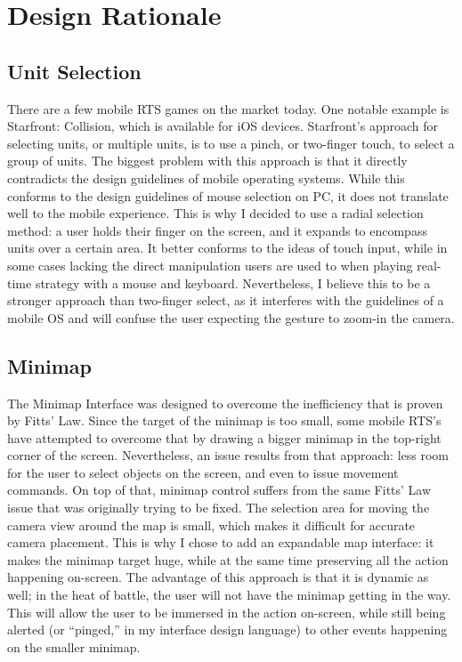 \documentclass[11pt]{article}
\begin{document}
\section{Design Rationale}
	\subsection{Unit Selection}
	There are a few mobile RTS games on the market today. One notable example is Starfront: Collision, which is available for iOS devices. Starfront's approach for selecting units, or multiple units, is to use a pinch, or two-finger touch, to select a group of units. The biggest problem with this approach is that it directly contradicts the design guidelines of mobile operating systems. While this conforms to the design guidelines of mouse selection on PC, it does not translate well to the mobile experience. This is why I decided to use a radial selection method: a user holds their finger on the screen, and it expands to encompass units over a certain area. It better conforms to the ideas of touch input, while in some cases lacking the direct manipulation users are used to when playing real-time strategy with a mouse and keyboard. Nevertheless, I believe this to be a stronger approach than two-finger select, as it interferes with the guidelines of a mobile OS and will confuse the user expecting the gesture to zoom-in the camera.
	\subsection{Minimap}
	The Minimap Interface was designed to overcome the inefficiency that is proven by Fitts' Law. Since the target of the minimap is too small, some mobile RTS's have attempted to overcome that by drawing a bigger minimap in the top-right corner of the screen. Nevertheless, an issue results from that approach: less room for the user to select objects on the screen, and even to issue movement commands. On top of that, minimap control suffers from the same Fitts' Law issue that was originally trying to be fixed. The selection area for moving the camera view around the map is small, which makes it difficult for accurate camera placement. This is why I chose to add an expandable map interface: it makes the minimap target huge, while at the same time preserving all the action happening on-screen. The advantage of this approach is that it is dynamic as well; in the heat of battle, the user will not have the minimap getting in the way. This will allow the user to be immersed in the action on-screen, while still being alerted (or ``pinged,'' in my interface design language) to other events happening on the smaller minimap.
\end{document}

